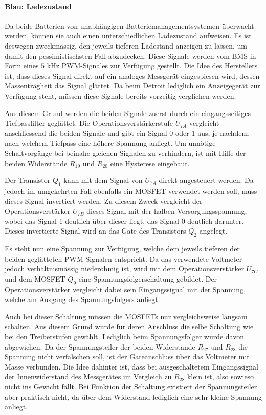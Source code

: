 \paragraph{Blau: Ladezustand}
Da beide Batterien von unabhängigen Batteriemanagementsystemen überwacht werden, können sie auch einen unterschiedlichen Ladezustand aufweisen. Es ist deswegen zweckmässig, den jeweils tieferen Ladestand anzeigen zu lassen, um damit den pessimistischsten Fall abzudecken. Diese Signale werden vom BMS in Form eines $5$ kHz PWM-Signales zur Verfügung gestellt. Die Idee des Herstellers ist, dass dieses Signal direkt auf ein analoges Messgerät eingespiesen wird, dessen Massenträgheit das Signal glättet. Da beim Detroit lediglich ein Anzeigegerät zur Verfügung steht, müssen diese Signale bereits vorzeitig verglichen werden.

Aus diesem Grund werden die beiden Signale zuerst durch ein eingangsseitiges Tiefpassfilter geglättet. Die Operationsverstärkerstufe $U_{7A}$ vergleicht anschliessend die beiden Signale und gibt ein Signal 0 oder 1 aus, je nachdem, nach welchem Tiefpass eine höhere Spannung anliegt. Um unnötige Schaltvorgänge bei beinahe gleichen Signalen zu verhindern, ist mit Hilfe der beiden Widerstände $R_{19}$ und $R_{20}$ eine Hysterese eingebaut.

Der Transistor $Q_1$ kann mit dem Signal von $U_{7A}$ direkt angesteuert werden. Da jedoch im umgekehrten Fall ebenfalls ein MOSFET verwendet werden soll, muss dieses Signal invertiert werden. Zu diesem Zweck vergleicht der Operationsverstärker $U_{7B}$ dieses Signal mit der halben Versorgungsspannung, wobei das Signal 1 deutlich über dieser liegt, das Signal 0 deutlich darunter. Dieses invertierte Signal wird an das Gate des Transistors $Q_2$ angelegt.

Es steht nun eine Spannung zur Verfügung, welche dem jeweils tieferen der beiden geglätteten PWM-Signalen entspricht. Da das verwendete Voltmeter jedoch verhältnismässig niederohmig ist, wird mit dem Operationsverstärker $U_{7C}$ und dem MOSFET $Q_9$ eine Spannungsfolgerschaltung gebildet. Der Operationsverstärker vergleicht dabei sein Eingangssignal mit der Spannung, welche am Ausgang des Spannungsfolgers anliegt.

Auch bei dieser Schaltung müssen die MOSFETs nur vergleichsweise langsam schalten. Aus diesem Grund wurde für deren Anschluss die selbe Schaltung wie bei den Treiberstufen gewählt. Lediglich beim Spannungsfolger wurde davon abgewichen. Da der Spannungsteiler der beiden Widerstände $R_{27}$ und $R_{28}$ die Spannung nicht verfälschen soll, ist der Gateanschluss über das Voltmeter mit Masse verbunden. Die Idee dahinter ist, dass bei ausgeschaltetem Eingangssignal der Innenwiderstand des Messgerätes im Vergleich zu $R_{28}$ klein ist, also sowieso nicht ins Gewicht fällt. Bei Funktion der Schaltung existiert der Spannungsteiler aber praktisch nicht, da über dem Widerstand lediglich eine sehr kleine Spannung anliegt.